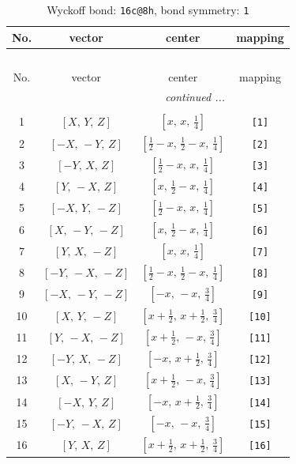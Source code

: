 \documentclass[fleqn,8pt]{jsarticle}
\begin{document}
\begin{longtable}{cccc}
\caption{Wyckoff bond: {\tt 16c@8h}, bond symmetry: {\tt 1}}
 \\
 \hline \hline
No. & vector & center & mapping \\ \hline \endfirsthead

\multicolumn{3}{l}{\tablename\ \thetable{}} \\
 \hline \hline
No. & vector & center & mapping \\ \hline \endhead

 \hline \hline
\multicolumn{3}{r}{\footnotesize\it continued ...} \\ \endfoot

 \hline \hline
\multicolumn{3}{r}{} \\ \endlastfoot

1 & $\left[ X,\, Y,\, Z \right]$ & $\left[ x,\, x,\, \frac{1}{4} \right]$ & {\tt [1]} \\ \hline
2 & $\left[ - X,\, - Y,\, Z \right]$ & $\left[ \frac{1}{2} - x,\, \frac{1}{2} - x,\, \frac{1}{4} \right]$ & {\tt [2]} \\ \hline
3 & $\left[ - Y,\, X,\, Z \right]$ & $\left[ \frac{1}{2} - x,\, x,\, \frac{1}{4} \right]$ & {\tt [3]} \\ \hline
4 & $\left[ Y,\, - X,\, Z \right]$ & $\left[ x,\, \frac{1}{2} - x,\, \frac{1}{4} \right]$ & {\tt [4]} \\ \hline
5 & $\left[ - X,\, Y,\, - Z \right]$ & $\left[ \frac{1}{2} - x,\, x,\, \frac{1}{4} \right]$ & {\tt [5]} \\ \hline
6 & $\left[ X,\, - Y,\, - Z \right]$ & $\left[ x,\, \frac{1}{2} - x,\, \frac{1}{4} \right]$ & {\tt [6]} \\ \hline
7 & $\left[ Y,\, X,\, - Z \right]$ & $\left[ x,\, x,\, \frac{1}{4} \right]$ & {\tt [7]} \\ \hline
8 & $\left[ - Y,\, - X,\, - Z \right]$ & $\left[ \frac{1}{2} - x,\, \frac{1}{2} - x,\, \frac{1}{4} \right]$ & {\tt [8]} \\ \hline
9 & $\left[ - X,\, - Y,\, - Z \right]$ & $\left[ - x,\, - x,\, \frac{3}{4} \right]$ & {\tt [9]} \\ \hline
10 & $\left[ X,\, Y,\, - Z \right]$ & $\left[ x + \frac{1}{2},\, x + \frac{1}{2},\, \frac{3}{4} \right]$ & {\tt [10]} \\ \hline
11 & $\left[ Y,\, - X,\, - Z \right]$ & $\left[ x + \frac{1}{2},\, - x,\, \frac{3}{4} \right]$ & {\tt [11]} \\ \hline
12 & $\left[ - Y,\, X,\, - Z \right]$ & $\left[ - x,\, x + \frac{1}{2},\, \frac{3}{4} \right]$ & {\tt [12]} \\ \hline
13 & $\left[ X,\, - Y,\, Z \right]$ & $\left[ x + \frac{1}{2},\, - x,\, \frac{3}{4} \right]$ & {\tt [13]} \\ \hline
14 & $\left[ - X,\, Y,\, Z \right]$ & $\left[ - x,\, x + \frac{1}{2},\, \frac{3}{4} \right]$ & {\tt [14]} \\ \hline
15 & $\left[ - Y,\, - X,\, Z \right]$ & $\left[ - x,\, - x,\, \frac{3}{4} \right]$ & {\tt [15]} \\ \hline
16 & $\left[ Y,\, X,\, Z \right]$ & $\left[ x + \frac{1}{2},\, x + \frac{1}{2},\, \frac{3}{4} \right]$ & {\tt [16]} \\
\end{longtable}
\end{document}
